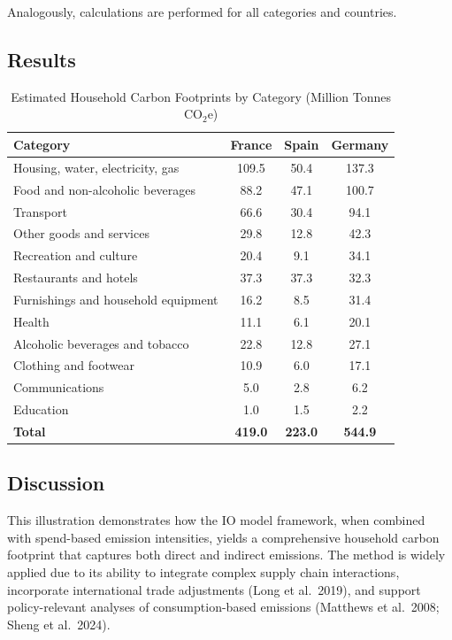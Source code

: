 \documentclass[12pt,a4paper]{article}%
\begin{document}
Analogously, calculations are performed for all categories and countries.

\subsection{Results}

\begin{table}[h]
\centering
\caption{Estimated Household Carbon Footprints by Category (Million Tonnes CO$_{2}$e)}
\label{tab:results}
\begin{tabular}{@{}lccc@{}}
\toprule
\textbf{Category} & \textbf{France} & \textbf{Spain} & \textbf{Germany}\\
\midrule
Housing, water, electricity, gas & 109.5 & 50.4 & 137.3\\
Food and non-alcoholic beverages & 88.2 & 47.1 & 100.7\\
Transport & 66.6 & 30.4 & 94.1\\
Other goods and services & 29.8 & 12.8 & 42.3\\
Recreation and culture & 20.4 & 9.1 & 34.1\\
Restaurants and hotels & 37.3 & 37.3 & 32.3\\
Furnishings and household equipment & 16.2 & 8.5 & 31.4\\
Health & 11.1 & 6.1 & 20.1\\
Alcoholic beverages and tobacco & 22.8 & 12.8 & 27.1\\
Clothing and footwear & 10.9 & 6.0 & 17.1\\
Communications & 5.0 & 2.8 & 6.2\\
Education & 1.0 & 1.5 & 2.2\\
\midrule
\textbf{Total} & \textbf{419.0} & \textbf{223.0} & \textbf{544.9}\\
\bottomrule
\end{tabular}
\end{table}

\subsection{Discussion}

This illustration demonstrates how the IO model framework, when combined with spend-based emission intensities, yields a comprehensive household carbon footprint that captures both direct and indirect emissions. The method is widely applied due to its ability to integrate complex supply chain interactions, incorporate international trade adjustments (Long et al.~2019), and support policy-relevant analyses of consumption-based emissions (Matthews et al.~2008; Sheng et al.~2024).
\end{document}
